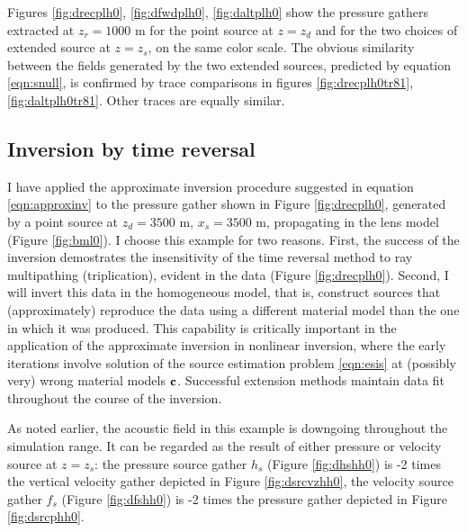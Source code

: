 
Figures
\ref{fig:drecplh0}, \ref{fig:dfwdplh0}, \ref{fig:daltplh0} show the pressure
gathers extracted at $z_r=1000$ m for the point source at $z=z_d$ and
for the two choices of extended source at $z=z_s$, on the same color
scale. The obvious similarity between the fields generated by the two
extended sources,
predicted by equation \ref{eqn:snull}, is confirmed by trace
comparisons in figures %
\ref{fig:drecplh0tr81},\ref{fig:daltplh0tr81}. Other traces are
equally similar.


\subsection{Inversion by time reversal}
I have applied the approximate inversion procedure suggested in
equation \ref{eqn:approxinv} to the pressure gather shown in Figure
\ref{fig:drecplh0}, generated by a point source
at $z_d=3500$ m, $x_s=3500$ m, propagating in the %
lens
model (Figure \ref{fig:bml0}). I choose this example for two
reasons. First, the success of the inversion demostrates the
insensitivity of the time reversal method to ray multipathing
(triplication), evident in the data (Figure \ref{fig:drecplh0}).
Second, I will invert this data in the homogeneous model, that is,
construct sources that (approximately) reproduce the data using a
different material model than the one in which it was produced. This
capability is critically important in the application of the
approximate inversion in nonlinear inversion, where the early iterations
involve solution of the source estimation problem \ref{eqn:esis} at
(possibly very) wrong material models ${\bf c}$. Successful extension
methods maintain data fit throughout the course of the inversion.

As noted earlier, the acoustic field in this example is downgoing
throughout the simulation range. It can be
regarded as the result of either pressure or velocity source at $z=z_s$: the
pressure source gather $h_s$ (Figure \ref{fig:dhshh0})  is -2 times the
vertical velocity gather depicted in Figure \ref{fig:dsrcvzhh0}, the
velocity source gather $f_s$ (Figure \ref{fig:dfshh0}) is -2 times the
pressure gather depicted in Figure \ref{fig:dsrcphh0}.

